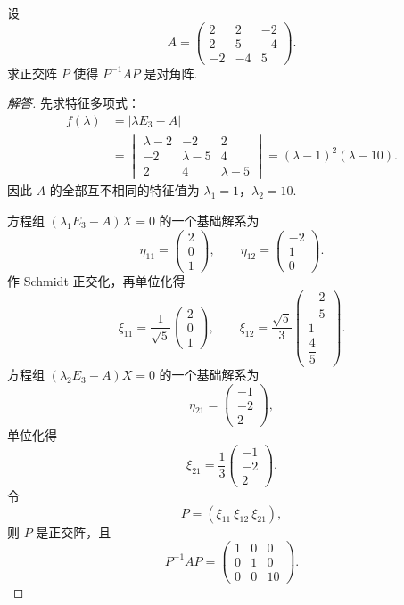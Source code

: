 \begin{example}
	设
	\[
	A=\begin{pmatrix}
		2&2&-2\\
		2&5&-4\\
		-2&-4&5
	\end{pmatrix}.
	\]
	求正交阵 $P$ 使得 $P^{-1}AP$ 是对角阵.
\end{example}
\begin{proof}[解答]
	先求特征多项式：
	\[
	\begin{aligned}
		f(\lambda)
		&=\left|\lambda E_3-A\right|\\
		&=\begin{vmatrix}
			\lambda-2&-2&2\\
			-2&\lambda-5&4\\
			2&4&\lambda-5
		\end{vmatrix}
		=(\lambda-1)^2(\lambda-10).
	\end{aligned}
	\]
	因此 $A$ 的全部互不相同的特征值为 $\lambda_1=1$，$\lambda_2=10$.
	
	方程组 $(\lambda_1E_3-A)X=0$ 的一个基础解系为
	\[
	\eta_{11}=\begin{pmatrix}2\\0\\1\end{pmatrix},
	\qquad
	\eta_{12}=\begin{pmatrix}-2\\1\\0\end{pmatrix}.
	\]
	作 Schmidt 正交化，再单位化得
	\[
	\xi_{11}=\frac1{\sqrt5}\begin{pmatrix}2\\0\\1\end{pmatrix},
	\qquad
	\xi_{12}=\frac{\sqrt5}{3}\begin{pmatrix}-\dfrac25\\1\\\dfrac45\end{pmatrix}.
	\]
	方程组 $(\lambda_2E_3-A)X=0$ 的一个基础解系为
	\[
	\eta_{21}=\begin{pmatrix}-1\\-2\\2\end{pmatrix},
	\]
	单位化得
	\[
	\xi_{21}=\frac13\begin{pmatrix}-1\\-2\\2\end{pmatrix}.
	\]
	令
	\[
	P=(\xi_{11}\ \xi_{12}\ \xi_{21}),
	\]
	则 $P$ 是正交阵，且
	\[
	P^{-1}AP=\begin{pmatrix}
		1&0&0\\
		0&1&0\\
		0&0&10
	\end{pmatrix}.
	\]
\end{proof}

